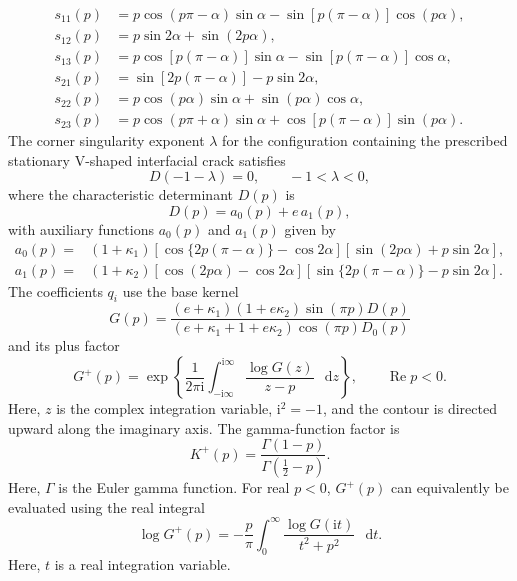 \documentclass[pdflatex,onecolumn,sn-mathphys-ay]{sn-jnl}
\newcommand{\dd}{\mathop{}\!\mathrm{d}}
\newcommand{\ii}{\mathrm{i}}
\begin{document}
\begin{equation*}
\begin{aligned}
  s_{11}(p)&=p\cos(p\pi-\alpha)\sin\alpha
             -\sin[p(\pi-\alpha)]\cos(p\alpha),\\
  s_{12}(p)&=p\sin2\alpha+\sin(2p\alpha),\\
  s_{13}(p)&=p\cos[p(\pi-\alpha)]\sin\alpha
             -\sin[p(\pi-\alpha)]\cos\alpha,\\
  s_{21}(p)&=\sin[2p(\pi-\alpha)]-p\sin2\alpha,\\
  s_{22}(p)&=p\cos(p\alpha)\sin\alpha
             +\sin(p\alpha)\cos\alpha,\\
  s_{23}(p)&=p\cos(p\pi+\alpha)\sin\alpha
             +\cos[p(\pi-\alpha)]\sin(p\alpha).
\end{aligned}
\end{equation*}
The corner singularity exponent $\lambda$ for the configuration
containing the prescribed stationary V-shaped interfacial crack satisfies
\begin{equation}
\label{eq:app-D-root}
  D(-1-\lambda)=0,
  \qquad -1<\lambda<0,
\end{equation}
where the characteristic determinant $D(p)$ is
\begin{equation*}
  D(p)=a_0(p)+e\,a_1(p),
\end{equation*}
with auxiliary functions $a_0(p)$ and $a_1(p)$ given by
\begin{equation*}
\begin{aligned}
  a_0(p)={}&(1+\kappa_1)
  [\cos\{2p(\pi-\alpha)\}-\cos2\alpha]
  [\sin(2p\alpha)+p\sin2\alpha],\\
  a_1(p)={}&(1+\kappa_2)
  [\cos(2p\alpha)-\cos2\alpha]
  [\sin\{2p(\pi-\alpha)\}-p\sin2\alpha].
\end{aligned}
\end{equation*}
The coefficients $q_i$ use the base kernel
\begin{equation*}
  G(p)=
  \frac{(e+\kappa_1)(1+e\kappa_2)\sin(\pi p)D(p)}
  {(e+\kappa_1+1+e\kappa_2)\cos(\pi p)D_0(p)}
\end{equation*}
and its plus factor
\begin{equation*}
  G^+(p)=
  \exp\!\left\{
    \frac{1}{2\pi\ii}
    \int_{-\ii\infty}^{\ii\infty}
    \frac{\log G(z)}{z-p}\,\dd z
  \right\},
  \qquad \operatorname{Re}p<0.
\end{equation*}
Here, $z$ is the complex integration variable, $\ii^2=-1$, and the contour
is directed upward along the imaginary axis. The gamma-function factor is
\begin{equation*}
  K^+(p)=\frac{\Gamma(1-p)}{\Gamma(\tfrac12-p)}.
\end{equation*}
Here, $\Gamma$ is the Euler gamma function. For real $p<0$, $G^+(p)$
can equivalently be evaluated using the real integral
\begin{equation*}
  \log G^+(p)
  =-\frac{p}{\pi}\int_0^\infty
    \frac{\log G(\ii t)}{t^2+p^2}\,\dd t.
\end{equation*}
Here, $t$ is a real integration variable.
\end{document}

